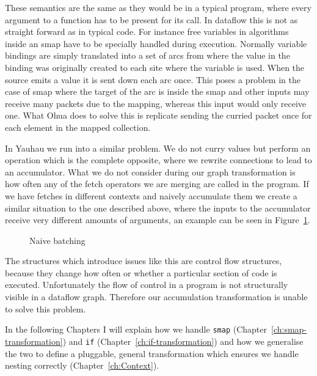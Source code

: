 These semantics are the same as they would be in a typical program, where every argument to a function has to be present for its call.
In dataflow this is not as straight forward as in typical code.
For instance free variables in algorithms inside an smap have to be specially handled during execution.
Normally variable bindings are simply translated into a set of arcs from where the value in the binding was originally created to each site where the variable is used.
When the source emits a value it is sent down each arc once.
This poses a problem in the case of smap where the target of the arc is inside the smap and other inputs may receive many packets due to the mapping, whereas this input would only receive one.
What Ohua does to solve this is replicate sending the curried packet once for each element in the mapped collection.

In Yauhau we run into a similar problem.
We do not curry values but perform an operation which is the complete opposite, where we rewrite connections to lead to an accumulator.
What we do not consider during our graph transformation is how often any of the fetch operators we are merging are called in the program.
If we have fetches in different contexts and naively accumulate them we create a similar situation to the one described above, where the inputs to the accumulator receive very different amounts of arguments, an example can be seen in Figure~\ref{fig:naive-batching-context-problem}.

\begin{figure}
	\caption{Naive batching}
	\label{fig:naive-batching-context-problem}
\end{figure}

The structures which introduce issues like this are control flow structures, because they change how often or whether a particular section of code is executed.
Unfortunately the flow of control in a program is not structurally visible in a dataflow graph.
Therefore our accumulation transformation is unable to solve this problem.

In the following Chapters I will explain how we handle \texttt{smap} (Chapter~\ref{ch:smap-transformation}) and \texttt{if} (Chapter~\ref{ch:if-transformation}) and how we generalise the two to define a pluggable, general transformation which ensures we handle nesting correctly (Chapter~\ref{ch:Context}).


